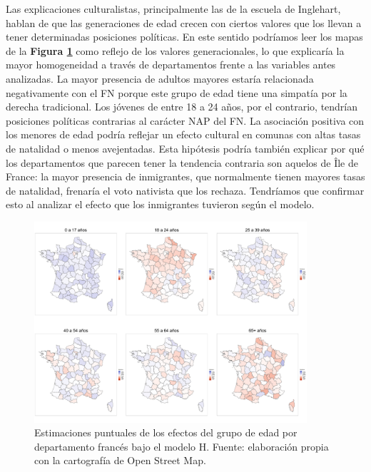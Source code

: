 Las explicaciones culturalistas, principalmente las de la escuela de Inglehart, hablan de que las generaciones de edad crecen con ciertos valores que los llevan a tener determinadas posiciones políticas. En este sentido podríamos leer los mapas de la \textbf{Figura \ref{fig:Mapa_Efectos_Edad}} como reflejo de los valores generacionales, lo que explicaría la mayor homogeneidad a través de departamentos frente a las variables antes analizadas. La mayor presencia de adultos mayores estaría relacionada negativamente con el FN porque este grupo de edad tiene una simpatía por la derecha tradicional. Los jóvenes de entre 18 a 24 años, por el contrario, tendrían posiciones políticas contrarias al carácter NAP del FN. La asociación positiva con los menores de edad podría reflejar un efecto cultural en comunas con altas tasas de natalidad o menos avejentadas. Esta hipótesis podría también explicar por qué los departamentos que parecen tener la tendencia contraria son aquelos de Île de France: la mayor presencia de inmigrantes, que normalmente tienen mayores tasas de natalidad, frenaría el voto nativista que los rechaza. Tendríamos que confirmar esto al analizar el efecto que los inmigrantes tuvieron según el modelo.\\

\begin{figure}
	\centering
	\includegraphics[width = 0.9\textwidth]{Figs/Efectos/Mapa_Efectos_Edad_Modelo_H}
	\caption{Estimaciones puntuales de los efectos del grupo de edad por departamento francés bajo el modelo H. Fuente: elaboración propia con la cartografía de Open Street Map.}
	\label{fig:Mapa_Efectos_Edad}
\end{figure}

